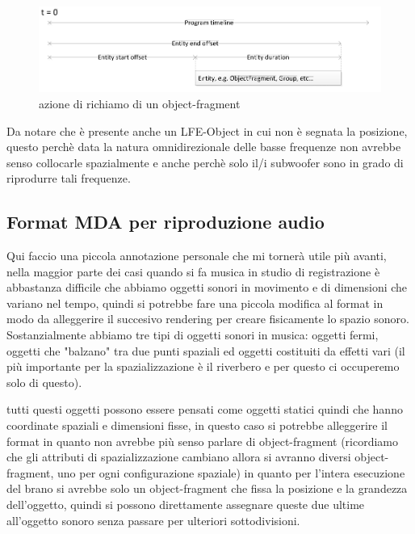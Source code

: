 \documentclass[12pt,a4paper]{report}
\begin{document}
\begin{figure}[htbp]
	\centering
	\includegraphics[scale=0.50]{figures/timeline2.png}
	
	\caption {azione di richiamo di un object-fragment} 
	\label{fig:time}
	\end{figure}

Da notare che è presente anche un LFE-Object in cui non è segnata la posizione, questo perchè data la natura omnidirezionale delle basse frequenze non avrebbe senso collocarle spazialmente e anche perchè solo il/i subwoofer sono in grado di riprodurre tali frequenze.

\subsection{Format MDA per riproduzione audio}

Qui faccio una piccola annotazione personale che mi tornerà utile più avanti, nella maggior parte dei casi quando si fa musica in studio di registrazione è abbastanza difficile che abbiamo oggetti sonori in movimento e di dimensioni che variano nel tempo, quindi si potrebbe fare una piccola modifica al format in modo da alleggerire il succesivo rendering per creare fisicamente lo spazio sonoro.\\

Sostanzialmente abbiamo tre tipi di oggetti sonori in musica: oggetti fermi, oggetti che "balzano" tra due punti spaziali ed oggetti costituiti da effetti vari (il più importante per la spazializzazione è il riverbero e per questo ci occuperemo solo di questo).

tutti questi oggetti possono essere pensati come oggetti statici quindi che hanno coordinate spaziali e dimensioni fisse, in questo caso si potrebbe alleggerire il format in quanto non avrebbe più senso parlare di object-fragment (ricordiamo che gli attributi di spazializzazione cambiano allora si avranno diversi object-fragment, uno per ogni configurazione spaziale) in quanto per l'intera esecuzione del brano si avrebbe solo un object-fragment che fissa la posizione e la grandezza dell'oggetto, quindi si possono direttamente assegnare queste due ultime all'oggetto sonoro senza passare per ulteriori sottodivisioni.\\
\end{document}

